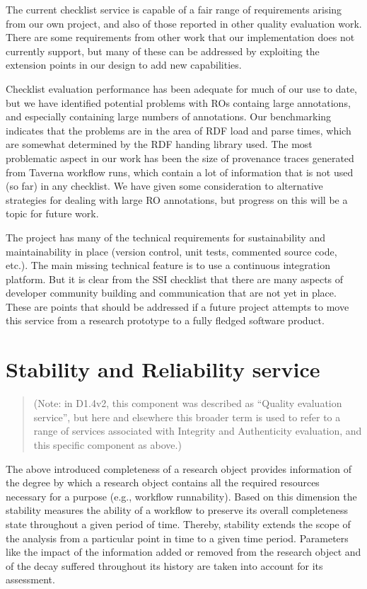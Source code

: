 The current checklist service is capable of a fair range of requirements
arising from our own project, and also of those reported in other
quality evaluation work. There are some requirements from other work
that our implementation does not currently support, but many of these
can be addressed by exploiting the extension points in our design to add
new capabilities.

Checklist evaluation performance has been adequate for much of our use
to date, but we have identified potential problems with ROs containg
large annotations, and especially containing large numbers of
annotations. Our benchmarking indicates that the problems are in the
area of RDF load and parse times, which are somewhat determined by the
RDF handing library used. The most problematic aspect in our work has
been the size of provenance traces generated from Taverna workflow runs,
which contain a lot of information that is not used (so far) in any
checklist. We have given some consideration to alternative strategies
for dealing with large RO annotations, but progress on this will be a
topic for future work.

The project has many of the technical requirements for sustainability
and maintainability in place (version control, unit tests, commented
source code, etc.). The main missing technical feature is to use a
continuous integration platform. But it is clear from the SSI checklist
that there are many aspects of developer community building and
communication that are not yet in place. These are points that should be
addressed if a future project attempts to move this service from a
research prototype to a fully fledged software product.

\section{Stability and Reliability service}

\begin{quote}
(Note: in D1.4v2, this component was described as ``Quality evaluation
service'', but here and elsewhere this broader term is used to refer to
a range of services associated with Integrity and Authenticity
evaluation, and this specific component as above.)
\end{quote}

The above introduced completeness of a research object provides
information of the degree by which a research object contains all the
required resources necessary for a purpose (e.g., workflow runnability).
Based on this dimension the stability measures the ability of a workflow
to preserve its overall completeness state throughout a given period of
time. Thereby, stability extends the scope of the analysis from a
particular point in time to a given time period. Parameters like the
impact of the information added or removed from the research object and
of the decay suffered throughout its history are taken into account for
its assessment.

